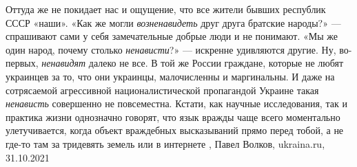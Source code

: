 Оттуда же не покидает нас и ощущение, что все жители бывших республик СССР
«наши». «Как же могли \emph{возненавидеть} друг друга братские народы?» —
спрашивают сами у себя замечательные добрые люди и не понимают. «Мы же один
народ, почему столько \emph{ненависти}?» — искренне удивляются другие.  Ну,
во-первых, \emph{ненавидят} далеко не все. В той же России граждане, которые не
любят украинцев за то, что они украинцы, малочисленны и маргинальны. И даже на
сотрясаемой агрессивной националистической пропагандой Украине такая
\emph{ненависть} совершенно не повсеместна. Кстати, как научные исследования,
так и практика жизни однозначно говорят, что язык вражды чаще всего моментально
улетучивается, когда объект враждебных высказываний прямо перед тобой, а не
где-то там за тридевять земель или в интернете
, Павел Волков, ukraina.ru, 31.10.2021

